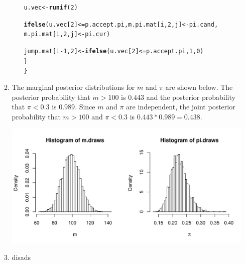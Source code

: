 \documentclass[12pt]{article}\usepackage[]{graphicx}\usepackage[]{color}
\makeatletter
\newcommand{\hlnum}[1]{\textcolor[rgb]{0.686,0.059,0.569}{#1}}%
\newcommand{\hlopt}[1]{\textcolor[rgb]{0,0,0}{#1}}%
\newcommand{\hlstd}[1]{\textcolor[rgb]{0.345,0.345,0.345}{#1}}%
\newcommand{\hlkwb}[1]{\textcolor[rgb]{0.69,0.353,0.396}{#1}}%
\newcommand{\hlkwd}[1]{\textcolor[rgb]{0.737,0.353,0.396}{\textbf{#1}}}%
\newenvironment{kframe}{%
 \def\at@end@of@kframe{}%
 \ifinner\ifhmode%
  \def\at@end@of@kframe{\end{minipage}}%
  \begin{minipage}{\columnwidth}%
 \fi\fi%
 \def\FrameCommand##1{\hskip\@totalleftmargin \hskip-\fboxsep
 \colorbox{shadecolor}{##1}\hskip-\fboxsep
     \hskip-\linewidth \hskip-\@totalleftmargin \hskip\columnwidth}%
 \MakeFramed {\advance\hsize-\width
   \@totalleftmargin\z@ \linewidth\hsize
   \@setminipage}}%
 {\par\unskip\endMakeFramed%
 \at@end@of@kframe}
\newenvironment{knitrout}{}{} %
\makeatother
\begin{document}
\begin{enumerate}
\begin{enumerate}
\begin{enumerate}
\begin{knitrout}
\begin{kframe}
\begin{alltt}
    \hlstd{u.vec} \hlkwb{<-} \hlkwd{runif}\hlstd{(}\hlnum{2}\hlstd{)}

    \hlkwd{ifelse}\hlstd{(u.vec[}\hlnum{2}\hlstd{]} \hlopt{<=} \hlstd{p.accept.pi, m.pi.mat[i,} \hlnum{2}\hlstd{, j]} \hlkwb{<-} \hlstd{pi.cand,}
           \hlstd{m.pi.mat[i,} \hlnum{2}\hlstd{, j]} \hlkwb{<-} \hlstd{pi.cur)}

    \hlstd{jump.mat[i}\hlopt{-}\hlnum{1}\hlstd{,} \hlnum{2}\hlstd{]} \hlkwb{<-} \hlkwd{ifelse}\hlstd{(u.vec[}\hlnum{2}\hlstd{]} \hlopt{<=} \hlstd{p.accept.pi,} \hlnum{1}\hlstd{,} \hlnum{0}\hlstd{)}
  \hlstd{\}}
\hlstd{\}}
\end{alltt}
\end{kframe}
\end{knitrout}



\end{enumerate}

\item The marginal posterior distributions for $m$ and $\pi$ are shown below. The posterior probability that $m>100$ is $0.443$ and the posterior probability that $\pi < 0.3$ is $0.989$. Since $m$ and $\pi$ are independent, the joint posterior probability that $m > 100$ and $\pi < 0.3$ is $0.443*0.989 = 0.438$.

\begin{knitrout}\footnotesize
{}\color{fgcolor}
\includegraphics[width=\linewidth]{figure/converdiags-1} 

\end{knitrout}

\item disads


\end{enumerate}
\end{enumerate}
\end{document}

